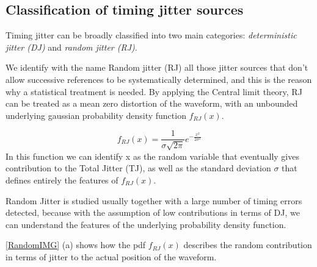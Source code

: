 \subsection{Classification of timing jitter sources}

Timing jitter can be broadly classified into two main categories: \emph{deterministic jitter (DJ)} and \emph{random jitter (RJ)}. 


We identify with the name Random jitter (RJ) all those jitter sources that don't allow successive references to be systematically determined, and this is the reason why a statistical treatment is needed.
By applying the Central limit theory, RJ can be treated as a mean zero distortion of the waveform, with an unbounded underlying gaussian probability density function $f_{RJ}(x)$.

\begin{equation}
f_{RJ}(x) = \frac{1}{\sigma \sqrt{2 \pi }}e^{-\frac{x^2}{2 \sigma ^2}}
\label{eq:RandJitter}
\end{equation}
In this function we can identify x as the random variable that eventually gives contribution to the Total Jitter (TJ), as well as the standard deviation $\sigma$ that defines entirely the features of $f_{RJ}(x)$.

Random Jitter is studied usually together with a large number of timing errors detected, because with the assumption of low contributions in terms of DJ, we can understand the features of the underlying probability density function.



\autoref{RandomIMG} (a) shows how the pdf $f_{RJ}(x)$ describes the random contribution in terms of jitter to the actual position of the waveform. %

